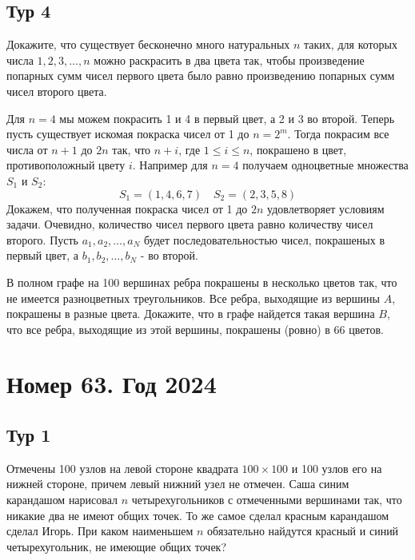 \documentclass[11pt, a4paper]{common/document_template}
\begin{document}
\section{Тур 4}

\begin{exercise}
Докажите, что существует бесконечно много натуральных $n$ таких, для которых числа $1, 2, 3, \dots, n$ можно раскрасить в два цвета так, чтобы произведение попарных сумм чисел первого цвета было равно произведению попарных сумм чисел второго цвета.
\end{exercise}

\begin{Solution}
Для $n = 4$ мы можем покрасить 1 и 4 в первый цвет, а 2 и 3 во второй. Теперь пусть существует искомая покраска чисел от 1 до $n = 2^{m}$. Тогда покрасим все числа от $n + 1$ до $2n$ так, что $n + i$, где $1 \leqslant i \leqslant n$, покрашено в цвет, противоположный цвету $i$. Например для $n = 4$ получаем одноцветные множества $S_{1}$ и $S_{2}$:
$$
S_{1} = (1, 4, 6, 7) \quad S_{2} = (2, 3, 5, 8)
$$
Докажем, что полученная покраска чисел от 1 до $2n$ удовлетворяет условиям задачи. Очевидно, количество чисел первого цвета равно количеству чисел второго. Пусть $a_{1}, a_{2}, \dots, a_{N}$ будет последовательностью чисел, покрашеных в первый цвет, а $b_{1}, b_{2}, \dots, b_{N}$ - во второй.
\end{Solution}

\begin{exercise}
В полном графе на 100 вершинах ребра покрашены в несколько цветов так, что не имеется разноцветных треугольников. Все ребра, выходящие из вершины $A$, покрашены в разные цвета. Докажите, что в графе найдется такая вершина $B$, что все ребра, выходящие из этой вершины, покрашены (ровно) в 66 цветов.
\end{exercise}


\chapter{Номер 63. Год 2024}

\section{Тур 1}

\begin{exercise}
Отмечены 100 узлов на левой стороне квадрата $100 \times 100$ и 100 узлов его на нижней стороне, причем левый нижний узел не отмечен. Саша синим карандашом нарисовал $n$ четырехугольников с отмеченными вершинами так, что никакие два не имеют общих точек. То же самое сделал красным карандашом сделал Игорь. При каком наименьшем $n$ обязательно найдутся красный и синий четырехугольник, не имеющие общих точек?
\end{exercise}
\end{document}
